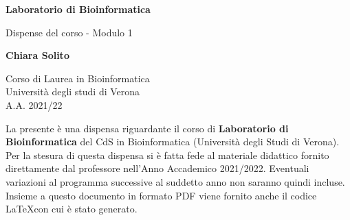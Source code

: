 \documentclass{article}
\begin{document}
\newcommand\tab[1][0.3cm]{\hspace*{#1}}


\begin{titlepage}
    \begin{center}
        \vspace*{1cm}
            
        \Huge
        \textbf{Laboratorio di Bioinformatica}
            
        \vspace{0.5cm}
        \LARGE
        Dispense del corso - Modulo 1
            
        \vspace{1.5cm}
            
        \textbf{Chiara Solito}

        \vspace{0.8cm}

            
        \Large
        Corso di Laurea in Bioinformatica\\
        Università degli studi di Verona\\
        A.A. 2021/22
            
    \end{center}
\end{titlepage}
La presente è una dispensa riguardante il corso di \textbf{Laboratorio di Bioinformatica} del CdS in Bioinformatica (Università degli Studi di Verona). Per la stesura di questa dispensa si è fatta fede al materiale didattico fornito direttamente dal professore nell'Anno Accademico 2021/2022. Eventuali variazioni al programma successive al suddetto anno non saranno quindi incluse.\\
Insieme a questo documento in formato PDF viene fornito anche il codice \LaTeX  con cui è stato generato.
\tableofcontents
\thispagestyle{empty}
\newpage
\thispagestyle{empty}
\end{document}
